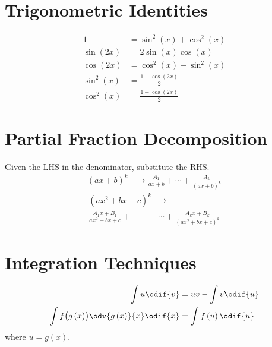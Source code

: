 \documentclass{article}
\begin{document}
\begin{multicols}{3}
    \section*{Trigonometric Identities}
    \begin{align*}
        1                        & = \sin^2{\left( x \right)} + \cos^2{\left( x \right)} \\
        \sin{\left( 2x \right)}  & = 2\sin{\left( x \right)}\cos{\left( x \right)}       \\
        \cos{\left( 2x \right)}  & = \cos^2{\left( x \right)} - \sin^2{\left( x \right)} \\
        \sin^2{\left( x \right)} & = \frac{1-\cos{\left( 2x \right)}}{2}                 \\
        \cos^2{\left( x \right)} & = \frac{1+\cos{\left( 2x \right)}}{2}
    \end{align*}
    \section*{Partial Fraction Decomposition}
    Given the LHS in the denominator, substitute the RHS\@.
    \begin{align*}
        \left(ax+b\right)^k & \to \frac{A_1}{ax+b} + \cdots + \frac{A_k}{\left( ax+b \right)^k}
    \end{align*}
    \begin{align*}
        \left(ax^2+bx+c\right)^k     & \to                                                   \\
        \frac{A_1x+B_1}{ax^2+bx+c} + & \cdots + \frac{A_k x+B_k}{\left( ax^2+bx+c \right)^k}
    \end{align*}
    \section*{Integration Techniques}
    \begin{align*}
        \int u \odif{v}                                                        & = uv - \int v \odif{u}            \\
        \int f\bigl(g\left( x \right)\bigr)\odv{g\left( x \right)}{x} \odif{x} & = \int f\left( u \right) \odif{u}
    \end{align*}
    where \(u = g\left( x \right)\).

\end{multicols}
\end{document}
